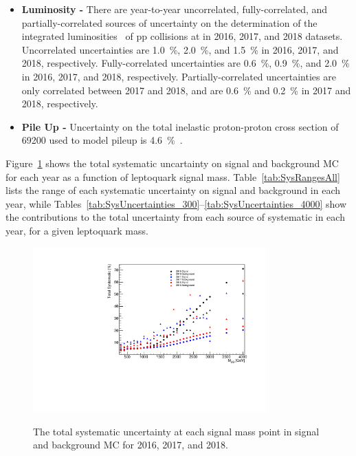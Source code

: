 \begin{itemize}
\item \textbf{Luminosity - }
There are year-to-year uncorrelated, fully-correlated, and partially-correlated sources of uncertainty on the determination of the integrated luminosities~\cite{CMS:LUM-17-003}\cite{CMS:LUM-17-004}\cite{CMS:LUM-18-002} of pp collisions at  in 2016, 2017, and 2018 datasets. Uncorrelated uncertainties are \SI{1.0}{\%}, \SI{2.0}{\%}, and \SI{1.5}{\%} in 2016, 2017, and 2018, respectively. Fully-correlated uncertainties are \SI{0.6}{\%}, \SI{0.9}{\%}, and \SI{2.0}{\%} in 2016, 2017, and 2018, respectively. Partially-correlated uncertainties are only correlated between 2017 and 2018, and are \SI{0.6}{\%} and \SI{0.2}{\%} in 2017 and 2018, respectively.

\item \textbf{Pile Up - }
Uncertainty on the total inelastic proton-proton cross section of \SI{69200}{\microbarn} used to model pileup is \SI{4.6}{\%}~\cite{CMS:ppInelasticCrossSection}. 
\end{itemize}

Figure~\ref{fig:totalSyst} shows the total systematic uncartainty on signal and background MC for each year as a function of leptoquark signal mass. Table~\ref{tab:SysRangesAll} lists the range of each systematic uncertainty on signal and background in each year, while Tables~\ref{tab:SysUncertainties_300}--\ref{tab:SysUncertainties_4000} show the contributions to the total uncertainty from each source of systematic in each year, for a given leptoquark mass.

\begin{figure}[H]
    \centering
    {\includegraphics[width=0.8\textwidth]{Images/Analysis/TotalSysVsLQMass.pdf}}
    \caption{The total systematic uncertainty at each signal mass point in signal and background MC for 2016, 2017, and 2018.}
    \label{fig:totalSyst}
\end{figure}

